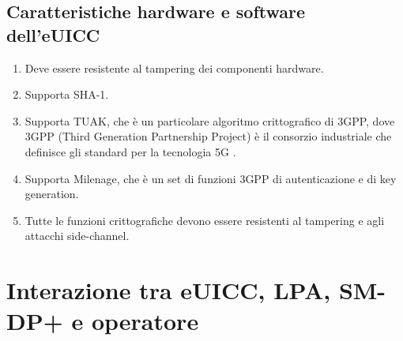 \documentclass[10pt, twoside, openany]{book}
\begin{document}
\subsection{Caratteristiche hardware e software dell'eUICC}
\begin{enumerate}
\item Deve essere resistente al tampering dei componenti hardware.
\item Supporta SHA-1.
\item Supporta TUAK, che è un particolare algoritmo crittografico di 3GPP, dove 3GPP (Third Generation Partnership Project) è il consorzio industriale che definisce gli standard per la tecnologia 5G .
\item Supporta Milenage, che è un set di funzioni 3GPP di autenticazione e di key generation.
\item Tutte le funzioni crittografiche devono essere resistenti al tampering e agli attacchi side-channel.
\end{enumerate}

\section{Interazione tra eUICC, LPA, SM-DP+ e operatore}
\end{document}
